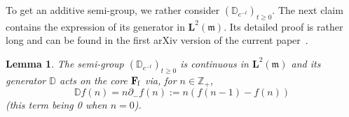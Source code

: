 \documentclass[10pt]{amsart}
\newtheorem{lemm}[theo]{Lemma}\newtheorem{prop}[theo]{Proposition}\newtheorem{coro}[theo]{Corollary}\newtheorem{conj}[theo]{Conjecture}
\theoremstyle{definition}\newtheorem{defi}[theo]{Definition}\newtheorem{rema}[theo]{Remark}\newtheorem{exam}[theo]{Example}\newtheorem{exem}[theo]{Example}\newtheorem{nota}[theo]{Notation}
\newcommand{\df}{\mathrel{:=}}
\newcommand{\ZZ}{\mathbb{Z}}
\newcommand{\fm}{\mathfrak{m}}
\newcommand{\pa}{\partial}
\newcommand{\esL}{\mathbf{L}}
\newcommand{\esF}{\mathbf{F}}
\newcommand{\esFf}{\esF_{\hskip-.3mm\mathrm{f}}}
\newcommand{\discret}[1]{\mathds{#1}}
\begin{document}
To get an additive semi-group, we rather consider $(\discret{D}_{e^{-t}})_{t\geq 0}$. The next claim contains the expression of its generator in $\esL^2(\fm)$. Its detailed proof is rather long and can be found in the first arXiv version of the current paper~\cite{arxivversion}.

\begin{lemm}\label{appl2}
The semi-group $(\discret{D}_{e^{-t}})_{t\geq 0}$ is continuous in $\esL^2(\fm)$ and its generator $\discret{D}$ acts on the core $\esFf$ via, for $n\in \ZZ_+$,
\begin{equation}\label{dD}
\discret{D}f(n)= n\pa_-f(n)\df n (f(n-1)-f(n))
\end{equation}
(this term being 0 when $n=0$).
\end{lemm}
\end{document}
